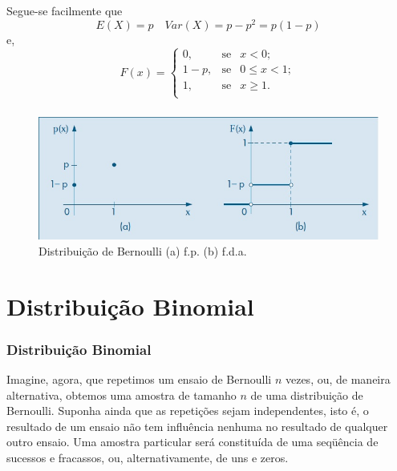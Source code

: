 \documentclass[14pt,aspectratio=1610]{beamer}
\begin{document}
\begin{frame}{}
\frametitle{}
\begin{block}{}
\justifying
Segue-se facilmente que
$$E(X)=p\quad Var(X)=p-p^{2}=p(1-p)$$
e,
$$
F(x)=\left\{
\begin{array}{ccccc}
0,           & \textrm{se} & x<0     ;\\
1-p,& \textrm{se} & 0\leq x<1;\\
1,           & \textrm{se} & x\geq 1 .\\
\end{array}
\right.
$$

\end{block}
\end{frame}

\begin{frame}{}
\frametitle{}
\begin{block}{}
\justifying
\begin{figure}[H]
    \centering
    \includegraphics[scale=0.5]{figs/Bernoulli}
    \caption{Distribuição de Bernoulli (a) f.p. (b) f.d.a.} %
  \end{figure}

\end{block}
\end{frame}

\section{Distribuição Binomial}
\begin{frame}{}
\frametitle{Distribuição Binomial}
\begin{block}{}
\justifying
Imagine, agora, que repetimos um ensaio de Bernoulli $n$ vezes, ou, de maneira
alternativa, obtemos uma amostra de tamanho $n$ de uma distribuição de Bernoulli.
Suponha ainda que as repetições sejam independentes, isto é, o resultado de um ensaio
não tem influência nenhuma no resultado de qualquer outro ensaio. Uma amostra
particular será constituída de uma seqüência de sucessos e fracassos, ou, alternativamente, de uns e zeros.
\end{block}
\end{frame}
\end{document}

